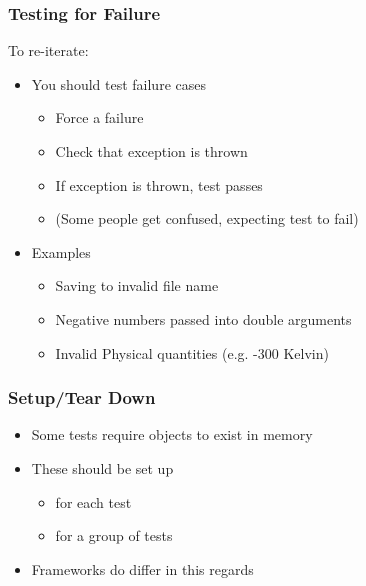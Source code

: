 \subsubsection{Testing for Failure}\label{testing-for-failure}

To re-iterate:

\begin{itemize}
\itemsep1pt\parskip0pt
\item
  You should test failure cases

  \begin{itemize}
  \itemsep1pt\parskip0pt
  \item
    Force a failure
  \item
    Check that exception is thrown
  \item
    If exception is thrown, test passes
  \item
    (Some people get confused, expecting test to fail)
  \end{itemize}
\item
  Examples

  \begin{itemize}
  \itemsep1pt\parskip0pt
  \item
    Saving to invalid file name
  \item
    Negative numbers passed into double arguments
  \item
    Invalid Physical quantities (e.g. -300 Kelvin)
  \end{itemize}
\end{itemize}

\subsubsection{Setup/Tear Down}\label{setuptear-down}

\begin{itemize}
\itemsep1pt\parskip0pt
\item
  Some tests require objects to exist in memory
\item
  These should be set up

  \begin{itemize}
  \itemsep1pt\parskip0pt
  \item
    for each test
  \item
    for a group of tests
  \end{itemize}
\item
  Frameworks do differ in this regards
\end{itemize}

